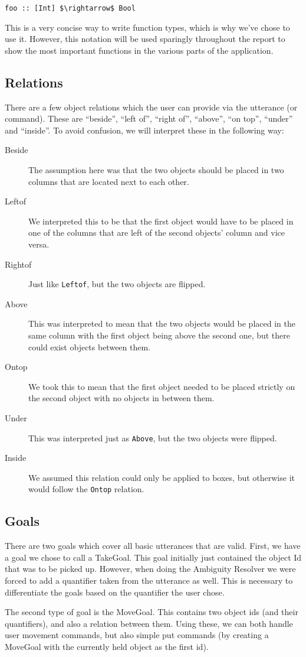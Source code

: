 \begin{lstlisting}
foo :: [Int] $\rightarrow$ Bool
\end{lstlisting}

This is a very concise way to write function types, which is why we've chose to use it. However, this notation will be used sparingly throughout the report to show the most important functions in the various parts of the application.

\subsection*{Relations}
There are a few object relations which the user can provide via the utterance (or command). These are ``beside'', ``left of'', ``right of'', ``above'', ``on top'', ``under'' and ``inside''. To avoid confusion, we will interpret these in the following way:

\begin{description}
  \item[Beside] The assumption here was that the two objects should be placed in
    two columns that are located next to each other.
  \item[Leftof] We interpreted this to be that the first object would have to be
    placed in one of the columns that are left of the second objects' column and
    vice versa.
  \item[Rightof] Just like \verb|Leftof|, but the two objects are flipped.
  \item[Above] This was interpreted to mean that the two objects would be placed
    in the same column with the first object being above the second one, but
    there could exist objects between them.
  \item[Ontop] We took this to mean that the first object needed to be placed
   strictly on the second object with no objects in between them.
  \item[Under] This was interpreted just as \verb|Above|, but the two objects
    were flipped.
  \item[Inside] We assumed this relation could only be applied to boxes, but
  otherwise it would follow the \verb|Ontop| relation.
\end{description}

\subsection*{Goals}
There are two goals which cover all basic utterances that are valid. First, we have a goal we chose to call a TakeGoal. This goal initially just contained the object Id that was to be picked up. However, when doing the Ambiguity Resolver we were forced to add a quantifier taken from the utterance as well. This is necessary to differentiate the goals based on the quantifier the user chose.

The second type of goal is the MoveGoal. This contains two object ids (and their quantifiers), and also a relation between them. Using these, we can both handle user movement commands, but also simple put commands (by creating a MoveGoal with the currently held object as the first id).
